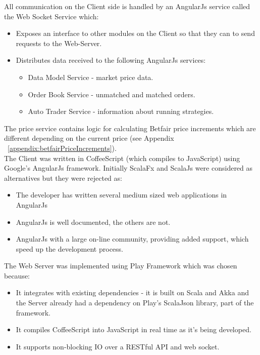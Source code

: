 	All communication on the Client side is handled by an AngularJs service called the Web Socket Service which:
	\begin{itemize}
		\item Exposes an interface to other modules on the Client so that they can to send requests to the Web-Server.
		\item Distributes data received to the following AngularJs services:
			\begin{itemize}
				\item Data Model Service - market price data.
				\item Order Book Service - unmatched and matched orders.
				\item Auto Trader Service - information about running strategies.
			\end{itemize}
	\end{itemize}
	The price service contains logic for calculating Betfair price increments which are different depending on the current price (see Appendix ~\ref{appendix:betfairPriceIncrements}).\\
		
	The Client was written in CoffeeScript (which compiles to JavaScript) using Google's AngularJs framework. Initially ScalaFx\cite{ScalaFx} and ScalaJs\cite{ScalaJs} were considered as alternatives but they were rejected as:
	\begin{itemize}
		\item The developer has written several medium sized web applications in AngularJs
		\item AngularJs is well documented, the others are not.
		\item AngularJs with a large on-line community, providing added support, which speed up the development process.
	\end{itemize}		

	The Web Server was implemented using Play Framework\cite{PlayFramework} which was chosen because:
	\begin{itemize}
		\item It integrates with existing dependencies - it is built on Scala and Akka and the Server already had a dependency on Play's ScalaJson library, part of the framework.
		\item It compiles CoffeeScript into JavaScript in real time as it's being developed.
		\item It supports non-blocking IO over a RESTful API and web socket.
	\end{itemize}		

